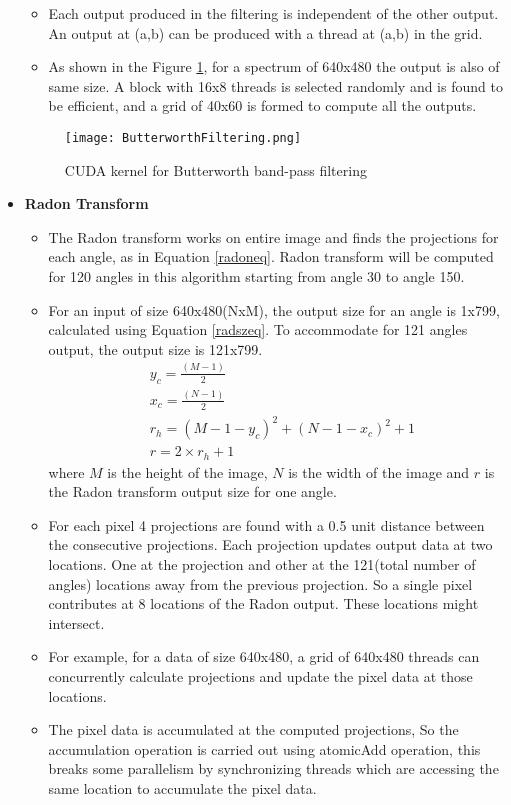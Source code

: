 \begin{itemize}
\begin{itemize}
	\item Each output produced in the filtering is independent of the other output. An output at (a,b) can be produced with a thread at (a,b) in the grid.
	\item As shown in the Figure \ref{fig:butterworth}, for a spectrum of 640x480 the output is also of same size. A block with 16x8 threads is selected randomly and is found to be efficient, and a grid of 40x60 is formed to compute all the outputs.
\end{itemize}
\begin{figure}[h!]
	\centering
	\texttt{[image: ButterworthFiltering.png]}
	\caption{CUDA kernel for Butterworth band-pass filtering}
	\label{fig:butterworth}
\end{figure}
\item \textbf{Radon Transform}
\begin{itemize}
	\item The Radon transform works on entire image and finds the projections for each angle, as in Equation \ref{radoneq}. Radon transform will be computed for 120 angles in this algorithm starting from angle 30 to angle 150.
	\item For an input of size 640x480(NxM), the output size for an angle is 1x799, calculated using Equation \ref{radszeq}. To accommodate for 121 angles output, the output size is 121x799.
	\begin{align}\label{radszeq}
	&y_c =  	\frac{(M-1)}{2}\\ &
	x_c = \frac{(N-1)}{2} \\  &
	r_h = (M-1-y_c)^2 + (N-1-x_c)^2 + 1\\&
	r = 2 \times r_h + 1
	\end{align}
	where $M$ is the height of the image, $N$ is the width of the image and $r$ is the Radon transform output size for one angle.  
	\item For each pixel 4 projections are found with a 0.5 unit distance between the consecutive projections. Each projection updates output data at two locations. One at the projection and other at the 121(total number of angles) locations away from the previous projection. So a single pixel contributes at 8 locations of the Radon output. These locations might intersect.
	\item For example, for a data of size 640x480, a grid of 640x480 threads can concurrently calculate projections and update the pixel data at those locations.
	\item The pixel data is accumulated at the computed projections, So the accumulation operation is carried out using atomicAdd operation, this breaks some parallelism by synchronizing threads which are accessing the same location to accumulate the pixel data.

\end{itemize}
\end{itemize}
